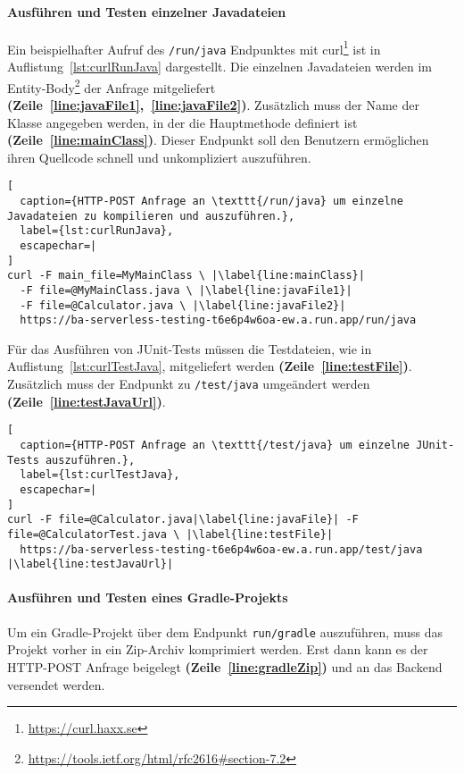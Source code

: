 \paragraph{Ausführen und Testen einzelner Javadateien} Ein beispielhafter Aufruf des
\texttt{/run/java} Endpunktes mit curl\footnote{\url{https://curl.haxx.se}} ist in
Auflistung~\ref{lst:curlRunJava} dargestellt.
Die einzelnen Javadateien werden im
Entity-Body\footnote{\url{https://tools.ietf.org/html/rfc2616\#section-7.2}}
der Anfrage mitgeliefert
\textbf{(Zeile~\ref{line:javaFile1},~\ref{line:javaFile2})}.
Zusätzlich muss der Name der Klasse
angegeben werden, in der die Hauptmethode definiert ist
\textbf{(Zeile~\ref{line:mainClass})}.
Dieser Endpunkt soll den Benutzern ermöglichen ihren Quellcode
schnell und unkompliziert auszuführen.\\

\begin{lstlisting}[
  caption={HTTP-POST Anfrage an \texttt{/run/java} um einzelne Javadateien zu kompilieren und auszuführen.},
  label={lst:curlRunJava},
  escapechar=|
]
curl -F main_file=MyMainClass \ |\label{line:mainClass}|
  -F file=@MyMainClass.java \ |\label{line:javaFile1}|
  -F file=@Calculator.java \ |\label{line:javaFile2}|
  https://ba-serverless-testing-t6e6p4w6oa-ew.a.run.app/run/java
\end{lstlisting}

Für das Ausführen von JUnit-Tests müssen die Testdateien, wie in Auflistung~\ref{lst:curlTestJava},
mitgeliefert werden \textbf{(Zeile~\ref{line:testFile})}.
Zusätzlich muss der Endpunkt zu \texttt{/test/java} umgeändert werden
\textbf{(Zeile~\ref{line:testJavaUrl})}.\\

\begin{lstlisting}[
  caption={HTTP-POST Anfrage an \texttt{/test/java} um einzelne JUnit-Tests auszuführen.},
  label={lst:curlTestJava},
  escapechar=|
]
curl -F file=@Calculator.java|\label{line:javaFile}| -F file=@CalculatorTest.java \ |\label{line:testFile}|
  https://ba-serverless-testing-t6e6p4w6oa-ew.a.run.app/test/java |\label{line:testJavaUrl}|
\end{lstlisting}

\paragraph{Ausführen und Testen eines Gradle-Projekts} Um ein Gradle-Projekt
über dem Endpunkt \texttt{run/gradle} auszuführen,
muss das Projekt vorher in ein Zip-Archiv komprimiert werden.
Erst dann kann es der HTTP-POST Anfrage beigelegt \textbf{(Zeile~\ref{line:gradleZip})}
und an das Backend versendet werden.\\

